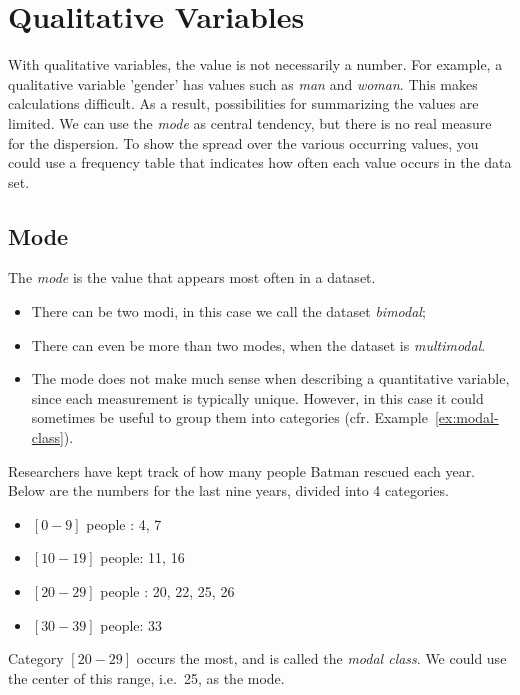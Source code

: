 \section{Qualitative Variables}
With qualitative variables, the value is not necessarily a number. For example, a qualitative variable 'gender' has values such as \emph{man} and \emph{woman}. This makes calculations difficult. As a result, possibilities for summarizing the values are limited. We can use the \emph{mode} as central tendency, but there is no real measure for the dispersion. To show the spread over the various occurring values, you could use a frequency table that indicates how often each value occurs in the data set.

\subsection{Mode}

\begin{definition}[Mode]
    The \emph{mode} is the value that appears most often in a dataset.
\end{definition}

\begin{itemize}
    \item There can be two modi, in this case we call the dataset \emph{bimodal};
    \item There can even be more than two modes, when the dataset is  \emph{multimodal}.
    \item The mode does not make much sense when describing a quantitative variable, since each measurement is typically unique. However, in this case it could sometimes be useful to group them into categories (cfr. Example~\ref{ex:modal-class}).
\end{itemize}

\begin{example}
    \label{ex:modal-class}
    Researchers have kept track of how many people Batman rescued each year. 
    Below are the numbers for the last nine years, divided into 4 categories.
    
    \begin{itemize}
        \item $[0-9]$ people : 4, 7
        \item $[10-19]$ people: 11, 16
        \item $[20-29]$ people : 20, 22, 25, 26
        \item $[30-39]$ people: 33
    \end{itemize}
    
    Category $[20-29]$ occurs the most, and is called the \emph{modal class}. We could use the center of this range, i.e.~25, as the mode.
\end{example}

